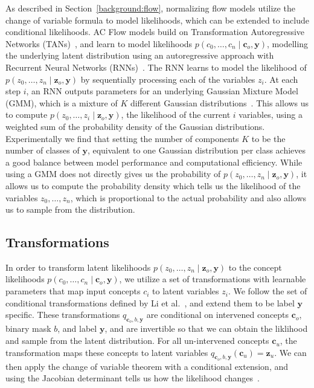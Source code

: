 As described in Section~\ref{background:flow}, 
normalizing flow models utilize the change of variable formula to model likelihoods,
which can be extended to include conditional likelihoods. AC Flow models build on
Transformation Autoregressive
Networks (TANs)~\cite{tans}, and learn to model 
likelihoods $p(c_0,\ldots, c_n \mid \mathbf{c}_o ,\mathbf{y})$,
modelling the underlying latent distribution using an autoregressive approach with Recurrent
Neural Networks (RNNs)~\cite{rnn}. The RNN learns to model the likelihood of 
$p(z_0, \ldots, z_n \mid \mathbf{z}_o , \mathbf{y})$ by sequentially processing each of the variables
 $z_i$.
At each step $i$, an RNN outputs parameters for an underlying Gaussian Mixture Model (GMM),
which is a mixture of $K$ different Gaussian distributions~\cite{gmm}.
This allows us to compute $p(z_0, \ldots, z_i \mid \mathbf{z}_o , \mathbf{y})$,
the likelihood of the current $i$ variables,
using a weighted
sum of the probability density of the Gaussian distributions. Experimentally
we find that setting the number of components $K$ to be the number of classes of
$\mathbf{y}$, equivalent to one Gaussian distribution per 
class 
achieves
a good balance between model performance and computational efficiency.
While using a GMM does not directly gives us the probability of
$p(z_0, \ldots, z_n \mid \mathbf{z}_o , \mathbf{y})$, 
it allows us to compute the probability density which tells us the likelihood of the
 variables $z_0, \ldots, z_n$, which is proportional
 to the actual probability and also allows us to sample from the distribution.

\subsection{Transformations}
In order to transform latent likelihoods $p(z_0, \ldots, z_n \mid \mathbf{z}_o , \mathbf{y})$ to 
the concept likelihoods
$p(c_0,\ldots, c_n \mid \mathbf{c}_o , \mathbf{y})$, we
utilize a set of transformations with learnable parameters that 
map input concepts $c_i$ to latent variables $z_i$. We follow the 
set of conditional transformations defined by Li et al.~\cite{acflow}, and extend them to
be label $\mathbf{y}$ specific.
These transformations $q_{\mathbf{c}_o, b, \mathbf{y}}$ are
conditional on 
intervened concepts $\mathbf{c}_o$, binary mask $b$, and label $\mathbf{y}$, 
and are invertible so that we can obtain the liklihood and 
sample from the latent distribution. 
For all un-intervened concepts $\mathbf{c}_u$,
the transformation maps these concepts to latent variables $q_{\mathbf{c}_o, b, \mathbf{y}}(\mathbf{c}_u) = \mathbf{z}_u$. 
We can then apply the change
of variable theorem with a conditional extension, and using
the Jacobian determinant tells us how the likelihood changes~\cite{normalizing-flows}.

